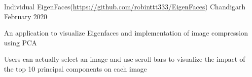 \begin{cventries}
\cventry
{Individual} %
{EigenFaces(\url{https://github.com/robinttt333/EigenFaces})} %
{Chandigarh} %
{February 2020 } %
{ %
\begin{cvitems}
\item {An application to visualize Eigenfaces and implementation of image compression using PCA}
\item {Users can actually select an image and use scroll bars to visualize the impact of the top 10 principal components on each image}
\end{cvitems}
}

\end{cventries}